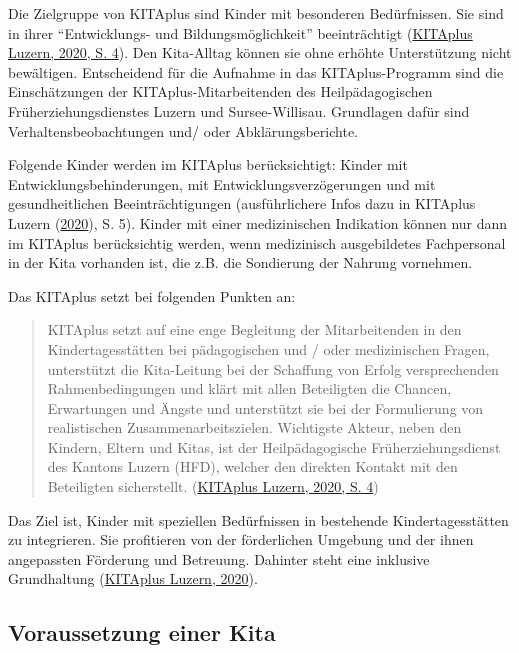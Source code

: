 \documentclass[
  ngerman,
  11pt,
  paper=a4,
  twoside,
  titlepage=true,
  openright,
  abstract=on,
  toc=listofnumbered,
  numbers=noenddot,
  chapterprefix=true,
  headings=optiontohead,
  svgnames,
  dvipsnames]{scrreprt}
\begin{document}
Die Zielgruppe von KITAplus sind Kinder mit besonderen Bedürfnissen. Sie
sind in ihrer “Entwicklungs- und Bildungsmöglichkeit” beeinträchtigt
(\protect\hyperlink{ref-konzeptKitaPlus}{KITAplus Luzern, 2020, S. 4}).
Den Kita-Alltag können sie ohne erhöhte Unterstützung nicht bewältigen.
Entscheidend für die Aufnahme in das KITAplus-Programm sind die
Einschätzungen der KITAplus-Mitarbeitenden des Heilpädagogischen
Früherziehungsdienstes Luzern und Sursee-Willisau. Grundlagen dafür sind
Verhaltensbeobachtungen und/ oder Abklärungsberichte.

Folgende Kinder werden im KITAplus berücksichtigt: Kinder mit
Entwicklungsbehinderungen, mit Entwicklungsverzögerungen und mit
gesundheitlichen Beeinträchtigungen (ausführlichere Infos dazu in
KITAplus Luzern (\protect\hyperlink{ref-konzeptKitaPlus}{2020}), S. 5).
Kinder mit einer medizinischen Indikation können nur dann im KITAplus
berücksichtig werden, wenn medizinisch ausgebildetes Fachpersonal in der
Kita vorhanden ist, die z.B. die Sondierung der Nahrung vornehmen.

Das KITAplus setzt bei folgenden Punkten an:

\begin{quote}
KITAplus setzt auf eine enge Begleitung der Mitarbeitenden in den
Kindertagesstätten bei pädagogischen und / oder medizinischen Fragen,
unterstützt die Kita-Leitung bei der Schaffung von Erfolg versprechenden
Rahmenbedingungen und klärt mit allen Beteiligten die Chancen,
Erwartungen und Ängste und unterstützt sie bei der Formulierung von
realistischen Zusammenarbeitszielen. Wichtigste Akteur, neben den
Kindern, Eltern und Kitas, ist der Heilpädagogische Früherziehungsdienst
des Kantons Luzern (HFD), welcher den direkten Kontakt mit den
Beteiligten sicherstellt.
(\protect\hyperlink{ref-konzeptKitaPlus}{KITAplus Luzern, 2020, S. 4})
\end{quote}

Das Ziel ist, Kinder mit speziellen Bedürfnissen in bestehende
Kindertagesstätten zu integrieren. Sie profitieren von der förderlichen
Umgebung und der ihnen angepassten Förderung und Betreuung. Dahinter
steht eine inklusive Grundhaltung
(\protect\hyperlink{ref-konzeptKitaPlus}{KITAplus Luzern, 2020}).

\hypertarget{voraussetzung-einer-kita}{%
\subsection{Voraussetzung einer Kita}\label{voraussetzung-einer-kita}}
\end{document}
